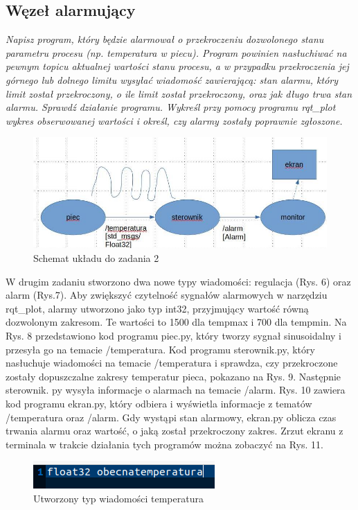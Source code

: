 \documentclass[10pt,a4paper,twoside,twocolumn]{article}%
\begin{document}
\subsection{Węzeł alarmujący}
\textit{Napisz program, który będzie alarmował o przekroczeniu dozwolonego stanu
parametru procesu (np. temperatura w piecu). Program powinien nasłuchiwać na
pewnym topicu aktualnej wartości stanu procesu, a w przypadku przekroczenia jej
górnego lub dolnego limitu wysyłać wiadomość zawierającą: stan alarmu, który
limit został przekroczony, o ile limit został przekroczony, oraz jak długo trwa
stan alarmu. Sprawdź działanie programu. Wykreśl przy pomocy programu rqt\_plot
wykres obserwowanej wartości i określ, czy alarmy zostały poprawnie zgłoszone.}

\begin{figure}[H]
    \centering
    \includegraphics[width=\linewidth]{1.png}
    \caption{Schemat układu do zadania 2}
\end{figure}

W drugim zadaniu stworzono dwa nowe typy wiadomości: regulacja (Rys\@. 6) oraz
alarm (Rys\@.7). Aby zwiększyć czytelność sygnałów alarmowych w narzędziu
rqt\_plot, alarmy utworzono jako typ int32, przyjmujący wartość równą dozwolonym
zakresom. Te wartości to 1500 dla tempmax i 700 dla tempmin. Na Rys\@. 8
przedstawiono kod programu piec.py, który tworzy sygnał sinusoidalny i przesyła
go na temacie /temperatura. Kod programu sterownik.py, który nasłuchuje
wiadomości na temacie /temperatura i sprawdza, czy przekroczone zostały
dopuszczalne zakresy temperatur pieca, pokazano na Rys\@. 9. Następnie sterownik.
py wysyła informacje o alarmach na temacie /alarm. Rys\@. 10 zawiera kod programu
ekran.py, który odbiera i wyświetla informacje z tematów /temperatura oraz
/alarm. Gdy wystąpi stan alarmowy, ekran.py oblicza czas trwania alarmu oraz
wartość, o jaką został przekroczony zakres. Zrzut ekranu z terminala w trakcie
działania tych programów można zobaczyć na Rys\@. 11.

\begin{figure}[H]
    \centering
    \includegraphics[width=0.6\linewidth]{2.png}
    \caption{Utworzony typ wiadomości temperatura}
\end{figure}
\end{document}
